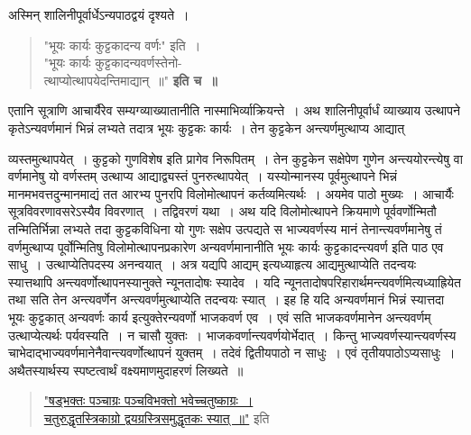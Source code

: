 \documentclass[11pt, openany]{book}
\begin{document}
अस्मिन् शालिनीपूर्वार्धेऽन्यपाठद्वयं दृश्यते~। 
\begin{quote}
     {\bs "भूयः कार्यः कुट्टकादन्य वर्णः"} इति~। \\
     
     \vspace{-5mm}
 {\bs "भूयः कार्यः कुट्टकादन्यवर्णस्तेनो- \\

\vspace{-7mm}
\hspace{2mm} त्थाप्योत्थापयेदन्तिमाद्यान्~॥"} \textbf{इति च~॥~}
\end{quote}

एतानि सूत्राणि आचार्यैरेव सम्यग्व्याख्यातानीति नास्माभिर्व्याक्रियन्ते~।
अथ शालिनीपूर्वार्धं व्याख्याय उत्थापने कृतेऽन्यवर्णमानं भिन्नं लभ्यते 
तदात्र भूयः कुट्टकः कार्यः~। तेन कुट्टकेन अन्त्यर्णमुत्थाप्य आद्यात्
\afterpage{\fancyhead[RO,LE]{\textbf{\thepage}}}
\cfoot{}
\newpage

\noindent व्यस्तमुत्थापयेत्~। कुट्टको गुणविशेष इति प्रागेव निरूपितम्~। तेन 
कुट्टकेन सक्षेपेण गुणेन अन्त्ययोरन्त्येषु वा वर्णमानेषु यो वर्णस्तम् उत्थाप्य 
आद्याद्व्यस्तं पुनरुत्थापयेत्~। यस्योन्मानस्य पूर्वमुत्थापने भिन्नं मानमभवत्तदुन्मानमाद्यं तत आरभ्य पुनरपि विलोमोत्थापनं कर्तव्यमित्यर्थः~। अयमेव पाठो
मुख्यः~। आचार्यैः सूत्रविवरणावसरेऽस्यैव विवरणात्~। तद्विवरणं यथा~।
अथ यदि विलोमोत्थापने क्रियमाणे पूर्ववर्णोन्मितौ तन्मितिर्भिन्ना लभ्यते तदा कुट्टकविधिना यो गुणः सक्षेप उत्पद्यते स भाज्यवर्णस्य मानं
तेनान्त्यवर्णमानेषु तं वर्णमुत्थाप्य पूर्वोन्मितिषु विलोमोत्थापनप्रकारेण अन्यवर्णमानानीति भूयः कार्यः कुट्टकादन्त्यवर्ण इति पाठ एव साधु~। उत्थाप्येतिपदस्य
अनन्वयात्~। अत्र यद्यपि आद्यम् इत्यध्याहृत्य आद्यमुत्थाप्येति तदन्वयः स्यात्तथापि 
अन्त्यवर्णोत्थापनस्यानुक्ते न्यूनतादोषः स्यादेव~। यदि न्यूनतादोषपरिहारार्थमन्त्यवर्णमित्यध्याह्रियेत तथा सति तेन अन्त्यवर्णेन
अन्त्यवर्णमुत्थाप्येति तदन्वयः स्यात्~। इह हि यदि अन्यवर्णमानं भिन्नं स्यात्तदा भूयः 
कुट्टकात् अन्यवर्णः कार्य इत्युक्तेरन्यवर्णो भाजकवर्ण एव~। एवं सति 
भाजकवर्णमानेन अन्त्यवर्णम् उत्थाप्येत्यर्थः पर्यवस्यति~। न चासौ युक्तः~। 
भाजकवर्णान्त्यवर्णयोर्भेदात्~। किन्तु भाज्यवर्णस्यान्त्यवर्णस्य
चाभेदाद्भाज्यवर्णमानेनैवान्त्यवर्णोत्थापनं युक्तम्~। तदेवं द्वितीयपाठो न साधुः~। एवं
तृतीयपाठोऽप्यसाधुः~। \\

\vspace{-3mm}
 अथैतस्यार्थस्य स्पष्टत्वार्थं वक्ष्यमाणमुदाहरणं लिख्यते~॥ 
\begin{quote}
\hyperref[Ex 81]{"षड्भक्तः पञ्चाग्रः पञ्चविभक्तो भवेच्चतुष्काग्रः~। \\
चतुरुद्धृतस्त्रिकाग्रो द्वयग्रस्त्रिसमुद्धृतकः स्यात्~॥"} इति
\end{quote}
 
\end{document}
